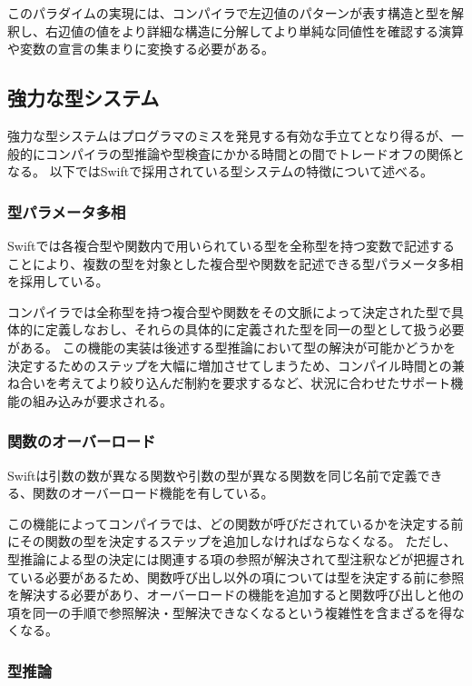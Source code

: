 このパラダイムの実現には、コンパイラで左辺値のパターンが表す構造と型を解釈し、右辺値の値をより詳細な構造に分解してより単純な同値性を確認する演算や変数の宣言の集まりに変換する必要がある。


\subsection{強力な型システム}

強力な型システムはプログラマのミスを発見する有効な手立てとなり得るが、一般的にコンパイラの型推論や型検査にかかる時間との間でトレードオフの関係となる。
以下ではSwiftで採用されている型システムの特徴について述べる。

\subsubsection{型パラメータ多相}

Swiftでは各複合型や関数内で用いられている型を全称型を持つ変数で記述することにより、複数の型を対象とした複合型や関数を記述できる型パラメータ多相を採用している。

コンパイラでは全称型を持つ複合型や関数をその文脈によって決定された型で具体的に定義しなおし、それらの具体的に定義された型を同一の型として扱う必要がある。
この機能の実装は後述する型推論において型の解決が可能かどうかを決定するためのステップを大幅に増加させてしまうため、コンパイル時間との兼ね合いを考えてより絞り込んだ制約を要求するなど、状況に合わせたサポート機能の組み込みが要求される。

\subsubsection{関数のオーバーロード}

Swiftは引数の数が異なる関数や引数の型が異なる関数を同じ名前で定義できる、関数のオーバーロード機能を有している。

この機能によってコンパイラでは、どの関数が呼びだされているかを決定する前にその関数の型を決定するステップを追加しなければならなくなる。
ただし、型推論による型の決定には関連する項の参照が解決されて型注釈などが把握されている必要があるため、関数呼び出し以外の項については型を決定する前に参照を解決する必要があり、オーバーロードの機能を追加すると関数呼び出しと他の項を同一の手順で参照解決・型解決できなくなるという複雑性を含まざるを得なくなる。

\subsubsection{型推論}

